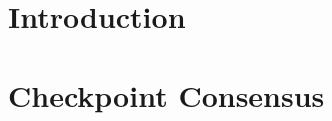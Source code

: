 \documentclass[a4paper,10pt,twoside]{report}
\author{\me}
\begin{document}


\normalsize

%
%
%
%
%
%
%
%
%
%
%
%
%
%
%
%
\chapter{Introduction}\label{chapter:intro}
\setcounter{page}{0}


\clearemptydoublepage

\chapter{Checkpoint Consensus}\label{chapter:consensus}

\end{document}
